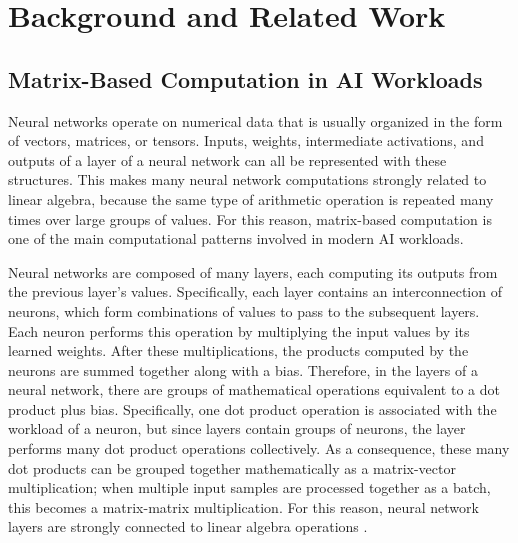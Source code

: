 \chapter{Background and Related Work}
\label{ch:background}

\section{Matrix-Based Computation in AI Workloads}
\label{sec:matrix_ai_workloads}

%
%
%
%
Neural networks operate on numerical data that is usually organized in the
form of vectors, matrices, or tensors. Inputs, weights, intermediate
activations, and outputs of a layer of a neural network can all be represented with these structures. This
makes many neural network computations strongly related to linear algebra,
because the same type of arithmetic operation is repeated many times over
large groups of values. For this reason, matrix-based computation is one of
the main computational patterns involved in modern AI workloads.

%
Neural networks are composed of many layers, each computing its outputs from the previous layer's values. Specifically, each layer contains an interconnection of neurons, which form combinations of values to pass to the subsequent layers. Each neuron performs this operation by multiplying the input values by its learned weights. After these multiplications, the products computed by the neurons are summed together along with a bias. Therefore, in the layers of a neural network, there are groups of mathematical operations equivalent to a dot product plus bias. Specifically, one dot product operation is associated with the workload of a neuron, but since layers contain groups of neurons, the layer performs many dot product operations collectively. As a consequence, these many dot products can be grouped together mathematically as a matrix-vector multiplication; when multiple input samples are processed together as a batch, this becomes a matrix-matrix multiplication. For this reason, neural network layers are strongly connected to linear algebra operations \cite{higham2018deeplearning}.

